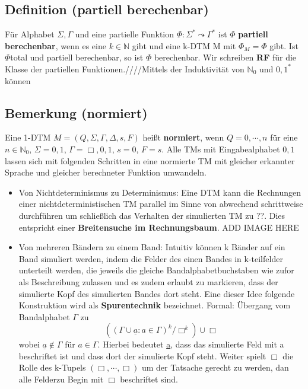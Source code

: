 \documentclass[a4paper,11pt]{article}
\begin{document}
\subsection{Definition (partiell berechenbar)}
Für Alphabet $\Sigma, \Gamma$ und eine partielle Funktion $\Phi : \Sigma^* \leadsto \Gamma^*$ ist $\Phi$ \textbf{partiell berechenbar}, wenn es eine $k \in \mathbb{N}$ gibt und eine k-DTM M mit $\Phi_M = \Phi$ gibt. Ist $\Phi $total und partiell berechenbar, so ist $\Phi$ berechenbar. Wir schreiben \textbf{RF} für die Klasse der partiellen Funktionen.////Mittels der Induktivität von $\mathbb{N}_0$ und ${0, 1}^*$ können 

\subsection{Bemerkung (normiert)} Eine 1-DTM $M = (Q, \Sigma, \Gamma, \Delta, s, F)$ heißt \textbf{normiert}, wenn $Q = {0,\cdots, n}$ für eine $n \in \mathbb{N}_{0}$, $\Sigma = {0, 1}$, $\Gamma = {\Box, 0, 1}$, $s = 0$, $F = {s}$. Alle TMs mit Eingabealphabet ${0,1}$ lassen sich mit folgenden Schritten in eine normierte TM mit gleicher erkannter Sprache und gleicher berechneter Funktion umwandeln. 
\begin{itemize}
  \item Von Nichtdeterminismus zu Determinismus: Eine DTM kann die Rechnungen einer nichtdeterministischen TM parallel im Sinne von abwechend schrittweise durchführen um schließlich das Verhalten der simulierten TM zu ??. Dies entspricht einer \textbf{Breitensuche im Rechnungsbaum}. ADD IMAGE HERE
  \item Von mehreren Bändern zu einem Band: Intuitiv können k Bänder auf ein Band simuliert werden, indem die Felder des einen Bandes in k-teilfelder unterteilt werden, die jeweils die gleiche Bandalphabetbuchstaben wie zufor als Beschreibung zulassen und es zudem erlaubt zu markieren, dass der simulierte Kopf des simulierten Bandes dort steht. Eine dieser Idee folgende Konstruktion wird als \textbf{Spurentechnik} bezeichnet. Formal: Übergang vom Bandalphabet $\Gamma$ zu \[((\Gamma \cup{\underline{a} : a \in \Gamma})^{k}/{\Box}^{k}) \cup {\Box}\] 
  wobei $\underline{a} \not \in \Gamma$ für $a \in \Gamma$. Hierbei bedeutet \underline{a}, dass das simulierte Feld mit a beschriftet ist und dass dort der simulierte Kopf steht. Weiter spielt $\Box$ die Rolle des k-Tupels $(\Box, \cdots, \Box)$ um der Tatsache gerecht zu werden, dan alle Felderzu Begin mit $\Box$ beschriftet sind.
\end{itemize}
\end{document}
